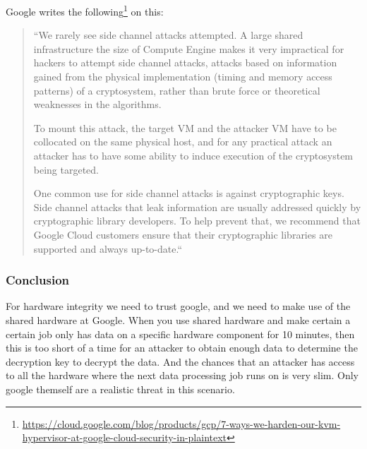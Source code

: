 Google writes the following\footnote{\url{https://cloud.google.com/blog/products/gcp/7-ways-we-harden-our-kvm-hypervisor-at-google-cloud-security-in-plaintext}} on this:\\
\begin{quote}
“We rarely see side channel attacks attempted. A large shared infrastructure the size of Compute Engine makes it very impractical for hackers to attempt side channel attacks, attacks based on information gained from the physical implementation (timing and memory access patterns) of a cryptosystem, rather than brute force or theoretical weaknesses in the algorithms. 

To mount this attack, the target VM and the attacker VM have to be collocated on the same physical host, and for any practical attack an attacker has to have some ability to induce execution of the cryptosystem being targeted. 

One common use for side channel attacks is against cryptographic keys. Side channel attacks that leak information are usually addressed quickly by cryptographic library developers. To help prevent that, we recommend that Google Cloud customers ensure that their cryptographic libraries are supported and always up-to-date.“ 
\end{quote}



\subsubsection*{Conclusion}

For hardware integrity we need to trust google, 
and we need to make use of the shared hardware at Google. 
When you use shared hardware and make certain a certain job 
only has data on a specific hardware component for 10 minutes, 
then this is too short of a time for an attacker to obtain enough data 
to determine the decryption key to decrypt the data. 
And the chances that an attacker has access to all the hardware 
where the next data processing job runs on is very slim. 
Only google themself are a realistic threat in this scenario.
